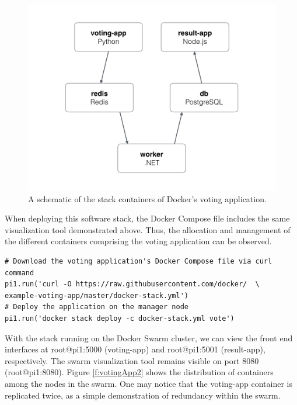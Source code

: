 \documentclass[sigconf]{acmart}
\begin{document}
\begin{figure}[!ht]
  \centering\includegraphics[width=\columnwidth]{images/votingApp.png}
  \caption{A schematic of the stack containers of Docker's voting application.}\label{f:votingApp}
\end{figure}

When deploying this software stack, the Docker Compose file includes the same visualization tool demonstrated above. Thus, the allocation and management of the different containers comprising the voting application can be observed.

\begin{lstlisting}
# Download the voting application's Docker Compose file via curl command
pi1.run('curl -O https://raw.githubusercontent.com/docker/  \
example-voting-app/master/docker-stack.yml')
# Deploy the application on the manager node
pi1.run('docker stack deploy -c docker-stack.yml vote')
\end{lstlisting}

With the stack running on the Docker Swarm cluster, we can view the front end interfaces at root@pi1:5000 (voting-app) and root@pi1:5001 (result-app), respectively. The swarm visualization tool remains visible on port 8080 (root@pi1:8080). Figure \ref{f:votingApp2} shows the distribution of containers among the nodes in the swarm. One may notice that the voting-app container is replicated twice, as a simple demonstration of redundancy within the swarm.
\end{document}
